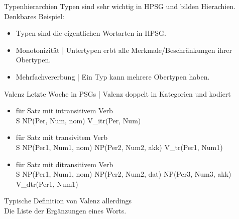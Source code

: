 \begin{frame}
  {Typenhierarchien}
  \onslide<+->
  \onslide<+->
  Typen sind sehr wichtig in HPSG und bilden \alert{Hierachien}. Denkbares Beispiel:\\
  \onslide<+->
  \Zeile
  \centering 
  \scalebox{0.7}{\begin{forest}
    [ wort
      [nomen
        [eigenname]
        [appellativum
          [zählsubstantiv]
          [stoffsubstantiv]
        ]
      ]
      [verb
        [finites-verb]
        [infinites-verb]
      ]
    ]
  \end{forest}}

  \Zeile
  \raggedright
  \begin{itemize}[<+->]
    \item Typen sind die eigentlichen \alert{Wortarten} in HPSG.
    \item \alert{Monotonizität} | \alert{Untertypen} erbt alle Merkmale\slash Beschränkungen ihrer \alert{Obertypen}.
    \item \alert{Mehrfachvererbung} | Ein Typ kann \alert{mehrere Obertypen} haben.
  \end{itemize}
\end{frame}

\begin{frame}
  {Valenz}
  \onslide<+->
  \onslide<+->
  Letzte Woche in PSGs | Valenz doppelt in \alert{Kategorien} und  kodiert\\
  \Halbzeile
  \begin{itemize}[<+->]
    \item[ ]  für Satz mit intransitivem Verb\\
      \footnotesize S \goesto NP(Per, Num, nom) \alert{V\_itr}(Per, Num)
    \item[ ]  für Satz mit transivitem Verb\\
      \footnotesize S \goesto NP(Per1, Num1, nom) NP(Per2, Num2, akk) \alert{V\_tr}(Per1, Num1)
    \item[ ]  für Satz mit ditransitivem Verb\\
      \footnotesize S \goesto NP(Per1, Num1, nom) NP(Per2, Num2, dat) NP(Per3, Num3, akk) \alert{V\_dtr}(Per1, Num1)
  \end{itemize}
  \onslide<+->
  \Zeile
  \alert{Typische Definition von Valenz allerdings}\\
  \onslide<+->
  Die \alert{Liste} der Ergänzungen eines Worts.\\
\end{frame}

